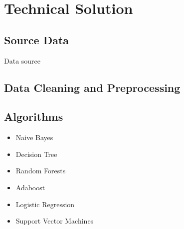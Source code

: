 \section{Technical Solution} \label{techsol}

\subsection{Source Data} \label{sourcedata}
Data source


\subsection{Data Cleaning and Preprocessing} \label{dataparser}

\subsection{Algorithms} \label{Algorithms}

\begin{itemize}
\item Naive Bayes

\item Decision Tree

\item Random Forests

\item Adaboost

\item Logistic Regression

\item Support Vector Machines


\end{itemize}






